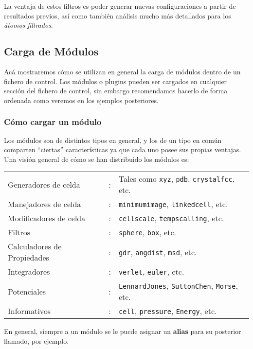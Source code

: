 La ventaja de estos filtros es poder generar nuevas configuraciones a partir de resultados previos, as\'i como tambi\'en an\'alisis mucho m\'as detallados para los \textit{\'atomos filtrados}.

\subsection{Carga de M\'odulos}

Ac\'a mostraremos c\'omo se utilizan en general la carga de m\'odulos dentro de un fichero de control. Los m\'odulos o plugins pueden ser cargados en cualquier secci\'on del fichero de control, sin embargo recomendamos hacerlo de forma ordenada como veremos en los ejemplos posteriores.

\subsubsection{C\'omo cargar un m\'odulo}

Los m\'odulos son de distintos tipos en general, y los de un tipo en com\'un comparten ``ciertas'' caracter\'isticas ya que cada uno posee sus propias ventajas. Una visi\'on general de c\'omo se han distribuido los m\'odulos es: 

\begin{tabular}{lcl}
 Generadores de celda & : & Tales como \verb|xyz|, \verb|pdb|, \verb|crystalfcc|, etc. \\
 Manejadores de celda & : &\verb|minimumimage|, \verb|linkedcell|, etc. \\
 Modificadores de celda & : &\verb|cellscale|, \verb|tempscalling|, etc.\\
 Filtros & : &\verb|sphere|, \verb|box|, etc.\\
 Calculadores de Propiedades & : & \verb|gdr|, \verb|angdist|, \verb|msd|, etc. \\
 Integradores & : & \verb|verlet|, \verb|euler|, etc. \\
 Potenciales & : & \verb|LennardJones|, \verb|SuttonChen|, \verb|Morse|, etc. \\
 Informativos & : & \verb|cell|, \verb|pressure|, \verb|Energy|, etc.
\end{tabular}

En general, siempre a un m\'odulo se le puede asignar un \textbf{alias} para su posterior llamado, por ejemplo.


